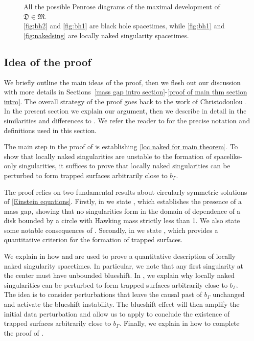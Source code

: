 \documentclass[11pt]{article}
\numberwithin{equation}{section}
\begin{document}
\begin{figure}[H]
\caption{All the possible Penrose diagrams of %
the maximal development of $\mathfrak{D}\in\mathfrak{M}.$ \\ \ref{fig:bh2} and \ref{fig:bh1} are black hole spacetimes, while \ref{fig:bh1} and \ref{fig:nakedsing} are locally naked singularity spacetimes.}
\label{fig:all_spacetimes}
\end{figure}


\subsection{Idea of the proof}\label{proof idea section} 

We briefly outline the main ideas of the proof, then we flesh out our discussion with more details in Sections~\ref{mass gap intro section}-\ref{proof of main thm section intro}. The overall strategy of the proof goes back to the work of Christodoulou \cite{ChrWCC}. In the present section we explain our argument, then we describe in detail in  the similarities and differences to \cite{ChrWCC}. We refer the reader to  for the precise notation and definitions used in this section.

The main step in the proof of  is establishing \eqref{loc naked for main theorem}. To show that locally naked singularities are unstable to the formation of spacelike-only singularities, it suffices to prove that locally naked singularities can be perturbed to form trapped surfaces arbitrarily close to $b_{\Gamma}$.

The proof relies on two fundamental results about circularly symmetric solutions of \eqref{Einstein equations}. Firstly, in  we state , which establishes the presence of a mass gap, showing that no singularities form in the domain of dependence of a disk bounded by a circle with Hawking mass strictly less than 1. We also state some notable consequences of . Secondly, in  we state , which provides a quantitative criterion for the formation of trapped surfaces. 

We explain in  how  and  are used to prove a quantitative description of locally naked singularity spacetimes. In particular, we note that any first singularity at the center must have unbounded blueshift. In , we explain why locally naked singularities can be perturbed to form trapped surfaces arbitrarily close to $b_{\Gamma}$. The idea is to consider perturbations that leave the causal past of $b_{\Gamma}$ unchanged and activate the blueshift instability. The blueshift effect will then amplify the initial data perturbation and allow us to apply  to conclude the existence of trapped surfaces arbitrarily close to $b_{\Gamma}$. Finally, we explain in  how to complete the proof of .
\end{document}
